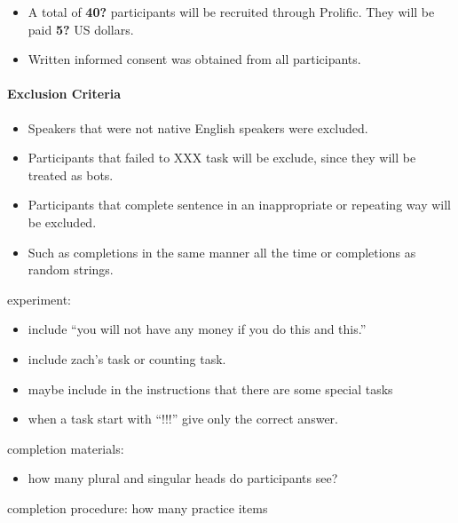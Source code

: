 \documentclass[
  10pt,
  letterpaper,
  DIV=11,
  numbers=noendperiod]{scrartcl}
\let\oldparagraph\paragraph
\renewcommand{\paragraph}[1]{\oldparagraph{#1}\mbox{}}
\providecommand{\tightlist}{%
  \setlength{\itemsep}{0pt}\setlength{\parskip}{0pt}}\usepackage{longtable,booktabs,array}
\begin{document}
\begin{itemize}
\tightlist
\item
  A total of \textbf{40?} participants will be recruited through
  Prolific. They will be paid \textbf{5?} US dollars.
\item
  Written informed consent was obtained from all participants.
\end{itemize}

\hypertarget{exclusion-criteria}{%
\paragraph{Exclusion Criteria}\label{exclusion-criteria}}

\begin{itemize}
\tightlist
\item
  Speakers that were not native English speakers were excluded.
\item
  Participants that failed to XXX task will be exclude, since they will
  be treated as bots.
\item
  Participants that complete sentence in an inappropriate or repeating
  way will be excluded.
\item
  Such as completions in the same manner all the time or completions as
  random strings.
\end{itemize}

\begin{tcolorbox}[enhanced jigsaw, opacitybacktitle=0.6, left=2mm, rightrule=.15mm, toprule=.15mm, coltitle=black, opacityback=0, colframe=quarto-callout-important-color-frame, colback=white, leftrule=.75mm, colbacktitle=quarto-callout-important-color!10!white, bottomrule=.15mm, title=\textcolor{quarto-callout-important-color}{\faExclamation}\hspace{0.5em}{To-dos}, titlerule=0mm, breakable, toptitle=1mm, bottomtitle=1mm, arc=.35mm]

experiment:

\begin{itemize}
\tightlist
\item
  include ``you will not have any money if you do this and this.''
\item
  include zach's task or counting task.
\item
  maybe include in the instructions that there are some special tasks
\item
  when a task start with ``!!!'' give only the correct answer.
\end{itemize}

completion materials:

\begin{itemize}
\tightlist
\item
  how many plural and singular heads do participants see?
\end{itemize}

completion procedure: how many practice items

\end{tcolorbox}
\end{document}
